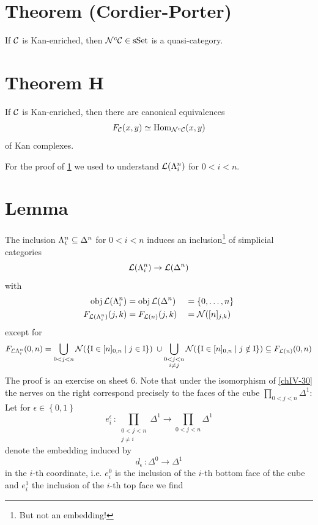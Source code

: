     \section{Theorem (Cordier-Porter)}\label{chIV-31}
        If $\mathcal{C}$ is Kan-enriched, then $\mathcal{N}^c \mathcal{C} \in \operatorname{sSet}$ is a quasi-category.

    \section{Theorem H}\label{chIV-thm-h}
        If $\mathcal{C}$ is Kan-enriched, then there are canonical equivalences
        \begin{equation*}
            F_{\mathcal{C}}(x, y) \simeq \operatorname{Hom}_{\mathcal{N}^c \mathcal{C}}(x, y)
        \end{equation*}
        of Kan complexes.
        \medskip

        For the proof of \ref{chIV-31} we used to understand $\mathcal{L}(\Lambda^{n}_{i})$ for $0 < i < n$.

    \section{Lemma}\label{chIV-33}
        The inclusion $\Lambda^{n}_{i} \subseteq \Delta^n$ for $0 < i < n$ induces an inclusion\footnote{But not an embedding!} of simplicial categories
        \begin{equation*}
            \mathcal{L}(\Lambda^{n}_{i}) \to \mathcal{L}(\Delta^n)
        \end{equation*}
        with
        \begin{alignat*}{2}
            \operatorname{obj} \mathcal{L}(\Lambda^{n}_{i}) &= \operatorname{obj} \mathcal{L}(\Delta^n) &&= \left\{ 0, \ldots, n \right\} \\
            F_{\mathcal{L}(\Lambda^{n}_{i})}(j, k) &= F_{\mathcal{L}(n)}(j, k) &&= \mathcal{N}([n]_{j, k})
        \end{alignat*}
        except for
        \begin{equation*}
            F_{\mathcal{L} \Lambda^{n}_{i}}(0, n) = \bigcup_{0 < j < n}\mathcal{N}(\left\{ \mathrm{I} \in [n]_{0,n} \mid j \in \mathrm{I} \right\}) \;\cup \bigcup_{\substack{0 < j < n\\ i \neq j}}\mathcal{N}(\left\{ \mathrm{I} \in [n]_{0,n} \mid j \notin \mathrm{I} \right\}) \subseteq F_{\mathcal{L}(n)}(0, n)
        \end{equation*}
        The proof is an exercise on sheet 6. Note that under the isomorphism of \ref{chIV-30} the nerves on the right correspond precisely to the faces of the cube $\prod\limits_{0<j<n} \Delta^1$: Let for $\epsilon \in \left\{ 0, 1 \right\}$
        \begin{equation*}
            e^{\epsilon}_i \,\colon \prod_{\substack{0<j<n \\ j \neq i}} \Delta^1 \to \prod_{0<j<n}\Delta^1
        \end{equation*}
        denote the embedding induced by
        \begin{equation*}
            d_{\epsilon} \,\colon \Delta^0 \to \Delta^1
        \end{equation*}
        in the $i$-th coordinate, i.e. $e^0_i$ is the inclusion of the $i$-th bottom face of the cube and $e^1_i$ the inclusion of the $i$-th top face we find
      
